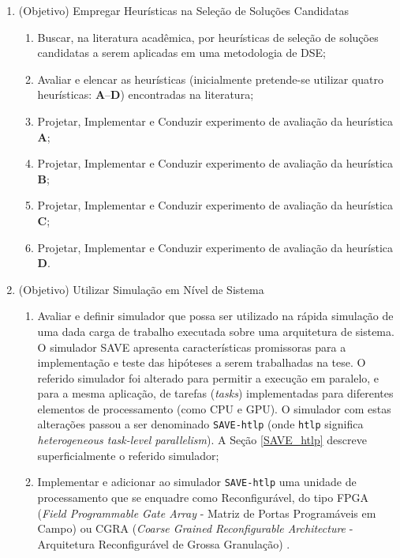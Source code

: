 \documentclass[tese-proposta,nocipinfo]{texufpel}
\begin{document}
\begin{enumerate}[start=0]
\item(Objetivo) {Empregar Heurísticas na Seleção de Soluções Candidatas}
\begin{enumerate}
\item Buscar, na literatura acadêmica, por heurísticas de seleção de soluções candidatas a serem aplicadas em uma metodologia de DSE;
\item Avaliar e elencar as heurísticas (inicialmente pretende-se utilizar quatro heurísticas: \textbf{A}--\textbf{D}) encontradas na literatura;
\item Projetar, Implementar e Conduzir experimento de avaliação da heurística \textbf{A};
\item Projetar, Implementar e Conduzir experimento de avaliação da heurística \textbf{B};
\item Projetar, Implementar e Conduzir experimento de avaliação da heurística \textbf{C};
\item Projetar, Implementar e Conduzir experimento de avaliação da heurística \textbf{D}.
\end{enumerate}

\item(Objetivo) {Utilizar Simulação em Nível de Sistema}
\begin{enumerate}
\item Avaliar e definir simulador que possa ser utilizado na rápida simulação de uma dada carga de trabalho executada sobre uma arquitetura de sistema. O simulador SAVE \cite{miele2015system} apresenta características promissoras para a implementação e teste das hipóteses a serem trabalhadas na tese. O referido simulador foi alterado para permitir a execução em paralelo, e para a mesma aplicação, de tarefas (\textit{tasks}) implementadas para diferentes elementos de processamento (como CPU e GPU). O simulador com estas alterações passou a ser denominado \texttt{SAVE-htlp} (onde \texttt{htlp} significa \textit{heterogeneous task-level parallelism}). A Seção \ref{SAVE_htlp} descreve superficialmente o referido simulador;
\item Implementar e adicionar ao simulador \texttt{SAVE-htlp} uma unidade de processamento que se enquadre como Reconfigurável, do tipo FPGA (\textit{Field Programmable Gate Array} - Matriz de Portas Programáveis em Campo) ou CGRA (\textit{Coarse Grained Reconfigurable Architecture} - Arquitetura Reconfigurável de Grossa Granulação) \cite{Mansureh2017}.

\end{enumerate}


\end{enumerate}
\end{document}
